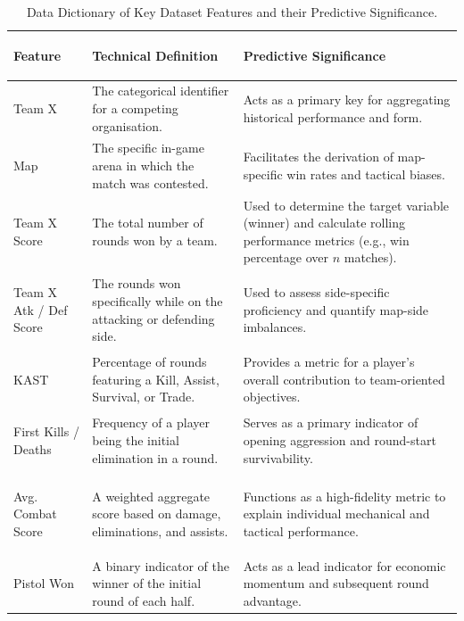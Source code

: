 \begin{table}[H]
    \centering
    \small
    \begin{tabularx}{\linewidth}{@{} >{\bfseries\raggedright\arraybackslash}p{3cm} >{\raggedright\arraybackslash}p{5cm} X @{}}
        \toprule
        \textbf{Feature} & \textbf{Technical Definition} & \textbf{Predictive Significance} \\ 
        \midrule
        
        Team X & The categorical identifier for a competing organisation. & Acts as a primary key for aggregating historical performance and form. \\
        \addlinespace
        
        \midrule
        Map & The specific in-game arena in which the match was contested. & Facilitates the derivation of map-specific win rates and tactical biases. \\
        \addlinespace
        
        \midrule
        Team X Score & The total number of rounds won by a team. & Used to determine the target variable (winner) and calculate rolling performance metrics (e.g., win percentage over $n$ matches). \\
        \addlinespace
        
        \midrule
        Team X Atk / Def Score & The rounds won specifically while on the attacking or defending side. & Used to assess side-specific proficiency and quantify map-side imbalances. \\
        \addlinespace
        
        \midrule
        KAST & Percentage of rounds featuring a Kill, Assist, Survival, or Trade. & Provides a metric for a player's overall contribution to team-oriented objectives. \\
        \addlinespace
        
        \midrule
        First Kills / Deaths & Frequency of a player being the initial elimination in a round. & Serves as a primary indicator of opening aggression and round-start survivability. \\
        \addlinespace
        
        \midrule
        Avg. Combat Score & A weighted aggregate score based on damage, eliminations, and assists. & Functions as a high-fidelity metric to explain individual mechanical and tactical performance. \\
        \addlinespace
        
        \midrule
        Pistol Won & A binary indicator of the winner of the initial round of each half. & Acts as a lead indicator for economic momentum and subsequent round advantage. \\
        \bottomrule
    \end{tabularx}
    \caption{Data Dictionary of Key Dataset Features and their Predictive Significance.}
    \label{tab:key-dataset-features}
\end{table}

